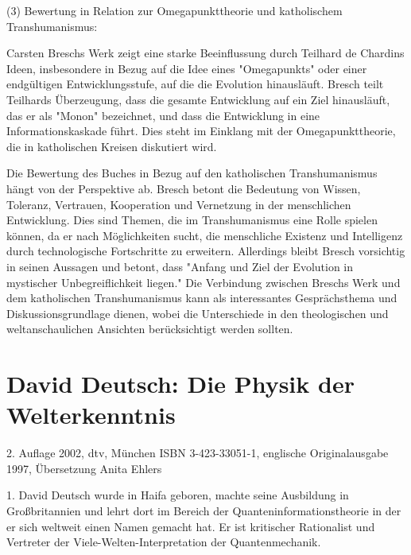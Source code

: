 \documentclass[
]{article}
\begin{document}
(3) Bewertung in Relation zur Omegapunkttheorie und katholischem Transhumanismus:

Carsten Breschs Werk zeigt eine starke Beeinflussung durch Teilhard de Chardins Ideen, insbesondere in Bezug auf die Idee eines "Omegapunkts" oder einer endgültigen Entwicklungsstufe, auf die die Evolution hinausläuft. Bresch teilt Teilhards Überzeugung, dass die gesamte Entwicklung auf ein Ziel hinausläuft, das er als "Monon" bezeichnet, und dass die Entwicklung in eine Informationskaskade führt. Dies steht im Einklang mit der Omegapunkttheorie, die in katholischen Kreisen diskutiert wird.

Die Bewertung des Buches in Bezug auf den katholischen Transhumanismus hängt von der Perspektive ab. Bresch betont die Bedeutung von Wissen, Toleranz, Vertrauen, Kooperation und Vernetzung in der menschlichen Entwicklung. Dies sind Themen, die im Transhumanismus eine Rolle spielen können, da er nach Möglichkeiten sucht, die menschliche Existenz und Intelligenz durch technologische Fortschritte zu erweitern. Allerdings bleibt Bresch vorsichtig in seinen Aussagen und betont, dass "Anfang und Ziel der Evolution in mystischer Unbegreiflichkeit liegen." Die Verbindung zwischen Breschs Werk und dem katholischen Transhumanismus kann als interessantes Gesprächsthema und Diskussionsgrundlage dienen, wobei die Unterschiede in den theologischen und weltanschaulichen Ansichten berücksichtigt werden sollten.

\section{David Deutsch: Die Physik der Welterkenntnis}\label{david-deutsch-die-physik-der-welterkenntnis}

2. Auflage 2002, dtv, München ISBN 3-423-33051-1, englische Originalausgabe 1997, Übersetzung Anita Ehlers

1. David Deutsch wurde in Haifa geboren, machte seine Ausbildung in Großbritannien und lehrt dort im Bereich der Quanteninformationstheorie in der er sich weltweit einen Namen gemacht hat. Er ist kritischer Rationalist und Vertreter der Viele-Welten-Interpretation der Quantenmechanik.
\end{document}
